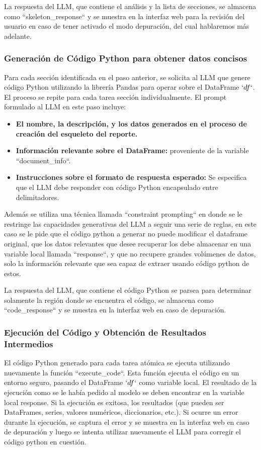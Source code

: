 La respuesta del LLM, que contiene el análisis y la lista de secciones,  se almacena como ``skeleton\_response`` y se muestra en la interfaz web para la revisión del usuario en caso de tener activado el modo depuración, del cual hablaremos más adelante.

\subsubsection{Generación de Código Python para obtener datos concisos}

Para cada sección identificada en el paso anterior, se solicita al LLM que genere código Python utilizando la librería Pandas para operar sobre el DataFrame $`df`$.  El proceso se repite para cada tarea sección individualmente.  El prompt formulado al LLM en este paso incluye:

\begin{itemize}
	\item \textbf{El nombre, la descripción, y los datos generados en el proceso de creación del esqueleto del reporte.}
	\item \textbf{Información relevante sobre el DataFrame:} proveniente de la variable  ``document\_info``.
	\item \textbf{Instrucciones sobre el formato de respuesta esperado:} Se especifica que el LLM debe responder con código Python encapsulado entre delimitadores.
\end{itemize}
Además se utiliza una técnica llamada ``constraint prompting`` en donde se le restringe las capacidades generativas del LLM a seguir una serie de reglas, en este caso se le pide que el código python a generar no puede modificar el dataframe original, que los datos relevantes que desee recuperar los debe almacenar en una variable local llamada ``response``, y que no recupere grandes volúmenes de datos, solo la información relevante que sea capaz de extraer usando código python de estos.

La respuesta del LLM, que contiene el código Python se parsea para determinar solamente la región donde se encuentra el código, se almacena como ``code\_response`` y se muestra en la interfaz web en caso de depuración.

\subsubsection{Ejecución del Código y Obtención de Resultados Intermedios}

El código Python generado para cada tarea atómica se ejecuta utilizando nuevamente la función ``execute\_code``.  Esta función ejecuta el código en un entorno seguro,  pasando el DataFrame $`df$` como variable local.  El resultado de la ejecución como se le había pedido al modelo se deben encontrar en la variable local response. Si la ejecución es exitosa,  los resultados (que pueden ser DataFrames, series, valores numéricos, diccionarios, etc.).  Si ocurre un error durante la ejecución,  se captura el error y se muestra en la interfaz web en caso de depuración y  luego se intenta utilizar nuevamente el LLM para corregir el código python en cuestión.

